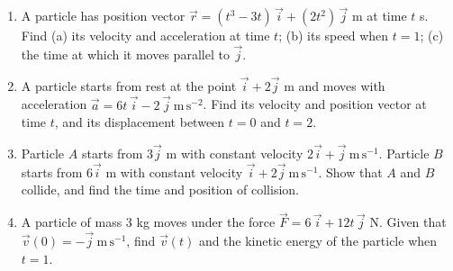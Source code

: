 \documentclass[11pt]{article}
\begin{document}
\begin{exercice}
\begin{enumerate}
\item A particle has position vector $\vec{r} = (t^3 - 3t)\,\vec{i} + (2t^2)\,\vec{j}$ m at time $t$ s. Find (a) its velocity and acceleration at time $t$; (b) its speed when $t = 1$; (c) the time at which it moves parallel to $\vec{j}$.
\item A particle starts from rest at the point $\vec{i} + 2\vec{j}$ m and moves with acceleration $\vec{a} = 6t\,\vec{i} - 2\,\vec{j}\ \mathrm{m\,s^{-2}}$. Find its velocity and position vector at time $t$, and its displacement between $t = 0$ and $t = 2$.
\item Particle $A$ starts from $3\vec{j}$ m with constant velocity $2\vec{i} + \vec{j}\ \mathrm{m\,s^{-1}}$. Particle $B$ starts from $6\vec{i}$ m with constant velocity $\vec{i} + 2\vec{j}\ \mathrm{m\,s^{-1}}$. Show that $A$ and $B$ collide, and find the time and position of collision.
\item A particle of mass $3$ kg moves under the force $\vec{F} = 6\,\vec{i} + 12t\,\vec{j}$ N. Given that $\vec{v}(0) = -\vec{j}\ \mathrm{m\,s^{-1}}$, find $\vec{v}(t)$ and the kinetic energy of the particle when $t = 1$.
\end{enumerate}
\end{exercice}
\end{document}
